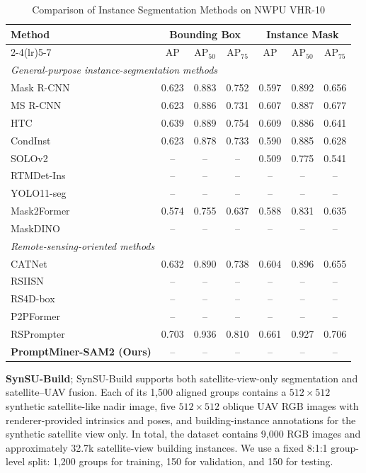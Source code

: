 \documentclass[letterpaper,journal]{IEEEtran}
\begin{document}
\begin{table}[!t]
\caption{Comparison of Instance Segmentation Methods on NWPU VHR-10}
\label{tab:nwpu}
\centering
\footnotesize
\begin{tabular}{lcccccc}
\toprule
\multirow{2}{*}{Method} & \multicolumn{3}{c}{Bounding Box} & \multicolumn{3}{c}{Instance Mask} \\
\cmidrule(lr){2-4}\cmidrule(lr){5-7}
& AP & AP$_{50}$ & AP$_{75}$ & AP & AP$_{50}$ & AP$_{75}$ \\
\midrule
\multicolumn{7}{l}{\textit{General-purpose instance-segmentation methods}} \\
Mask R-CNN~\cite{ref_maskrcnn} & 0.623 & 0.883 & 0.752 & 0.597 & 0.892 & 0.656 \\
MS R-CNN~\cite{ref_msrcnn} & 0.623 & 0.886 & 0.731 & 0.607 & 0.887 & 0.677 \\
HTC~\cite{ref_htc} & 0.639 & 0.889 & 0.754 & 0.609 & 0.886 & 0.641 \\
CondInst~\cite{ref_condinst} & 0.623 & 0.878 & 0.733 & 0.590 & 0.885 & 0.628 \\
SOLOv2~\cite{ref_solov2} & -- & -- & -- & 0.509 & 0.775 & 0.541 \\
RTMDet-Ins~\cite{ref_rtmdet} & -- & -- & -- & -- & -- & -- \\
YOLO11-seg~\cite{ref_yolo11} & -- & -- & -- & -- & -- & -- \\
Mask2Former~\cite{ref_mask2former} & 0.574 & 0.755 & 0.637 & 0.588 & 0.831 & 0.635 \\
MaskDINO~\cite{ref_maskdino} & -- & -- & -- & -- & -- & -- \\
\midrule
\multicolumn{7}{l}{\textit{Remote-sensing-oriented methods}} \\
CATNet~\cite{ref_catnet} & 0.632 & 0.890 & 0.738 & 0.604 & 0.896 & 0.655 \\
RSIISN~\cite{ref_rsiisn} & -- & -- & -- & -- & -- & -- \\
RS4D-box~\cite{ref_rs4d} & -- & -- & -- & -- & -- & -- \\
P2PFormer~\cite{ref_p2pformer} & -- & -- & -- & -- & -- & -- \\
RSPrompter~\cite{ref_rsprompter} & 0.703 & 0.936 & 0.810 & 0.661 & 0.927 & 0.706 \\
\midrule
\textbf{PromptMiner-SAM2 (Ours)} & -- & -- & -- & -- & -- & -- \\
\bottomrule
\end{tabular}
\end{table}

\noindent\textbf{SynSU-Build};
SynSU-Build supports both satellite-view-only segmentation and satellite--UAV fusion. Each of its
1,500 aligned groups contains a $512\times512$ synthetic satellite-like nadir image, five
$512\times512$ oblique UAV RGB images with renderer-provided intrinsics and poses, and
building-instance annotations for the synthetic satellite view only. In total, the dataset
contains 9,000 RGB images and approximately 32.7k satellite-view building instances. We use a
fixed 8:1:1 group-level split: 1,200 groups for training, 150 for validation, and 150 for
testing.
\end{document}
